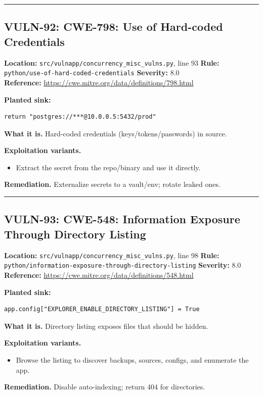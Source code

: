 \documentclass[11pt,a4paper]{article}
\begin{document}
\vspace{4pt}\hrule\vspace{6pt}
\subsection{VULN-92: CWE-798: Use of Hard-coded Credentials}
\noindent\textbf{Location:} \texttt{src/vulnapp/concurrency\_misc\_vulns.py}, line 93 \quad \textbf{Rule:} \texttt{python/use-of-hard-coded-credentials} \quad \textbf{Severity:} 8.0
\\ \textbf{Reference:} \url{https://cwe.mitre.org/data/definitions/798.html}

\noindent\textbf{Planted sink:}
\begin{lstlisting}
return "postgres://***@10.0.0.5:5432/prod"
\end{lstlisting}
\noindent\textbf{What it is.} Hard-coded credentials (keys/tokens/passwords) in source.

\noindent\textbf{Exploitation variants.}
\begin{itemize}[leftmargin=1.4em,itemsep=1pt,topsep=2pt]
\item Extract the secret from the repo/binary and use it directly.
\end{itemize}
\noindent\textbf{Remediation.} Externalize secrets to a vault/env; rotate leaked ones.

\vspace{4pt}\hrule\vspace{6pt}
\subsection{VULN-93: CWE-548: Information Exposure Through Directory Listing}
\noindent\textbf{Location:} \texttt{src/vulnapp/concurrency\_misc\_vulns.py}, line 98 \quad \textbf{Rule:} \texttt{python/information-exposure-through-directory-listing} \quad \textbf{Severity:} 8.0
\\ \textbf{Reference:} \url{https://cwe.mitre.org/data/definitions/548.html}

\noindent\textbf{Planted sink:}
\begin{lstlisting}
app.config["EXPLORER_ENABLE_DIRECTORY_LISTING"] = True
\end{lstlisting}
\noindent\textbf{What it is.} Directory listing exposes files that should be hidden.

\noindent\textbf{Exploitation variants.}
\begin{itemize}[leftmargin=1.4em,itemsep=1pt,topsep=2pt]
\item Browse the listing to discover backups, sources, configs, and enumerate the app.
\end{itemize}
\noindent\textbf{Remediation.} Disable auto-indexing; return 404 for directories.
\end{document}

